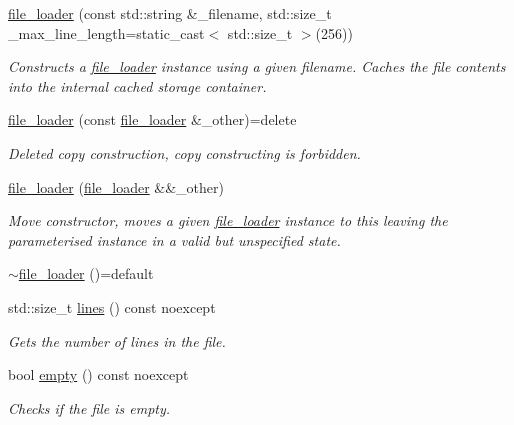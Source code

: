 \begin{DoxyCompactItemize}
\item 
\hyperlink{classcrsc_1_1file__loader_a3587f70d35af4b9ce7c9e4427032248a}{file\+\_\+loader} (const std\+::string \&\+\_\+filename, std\+::size\+\_\+t \+\_\+max\+\_\+line\+\_\+length=static\+\_\+cast$<$ std\+::size\+\_\+t $>$(256))
\begin{DoxyCompactList}\small\item\em Constructs a \hyperlink{classcrsc_1_1file__loader}{file\+\_\+loader} instance using a given filename. Caches the file contents into the internal cached storage container. \end{DoxyCompactList}\item 
\hyperlink{classcrsc_1_1file__loader_a9597d10be2e752905f4b29de242634b5}{file\+\_\+loader} (const \hyperlink{classcrsc_1_1file__loader}{file\+\_\+loader} \&\+\_\+other)=delete
\begin{DoxyCompactList}\small\item\em Deleted copy construction, copy constructing is forbidden. \end{DoxyCompactList}\item 
\hyperlink{classcrsc_1_1file__loader_aebc675bf2d258f4624e7d3b8e6ee206e}{file\+\_\+loader} (\hyperlink{classcrsc_1_1file__loader}{file\+\_\+loader} \&\&\+\_\+other)
\begin{DoxyCompactList}\small\item\em Move constructor, moves a given \hyperlink{classcrsc_1_1file__loader}{file\+\_\+loader} instance to this leaving the parameterised instance in a valid but unspecified state. \end{DoxyCompactList}\item 
\hyperlink{classcrsc_1_1file__loader_a368c4aa152572540bbd0fe174da7ace7}{$\sim$file\+\_\+loader} ()=default
\item 
std\+::size\+\_\+t \hyperlink{classcrsc_1_1file__loader_a14ca83e45f497847f17a229e32837d26}{lines} () const  noexcept
\begin{DoxyCompactList}\small\item\em Gets the number of lines in the file. \end{DoxyCompactList}\item 
bool \hyperlink{classcrsc_1_1file__loader_a15a6d5c3df4fd5a0e21e82c15098a46e}{empty} () const  noexcept
\begin{DoxyCompactList}\small\item\em Checks if the file is empty. \end{DoxyCompactList}\item 

\end{DoxyCompactItemize}
